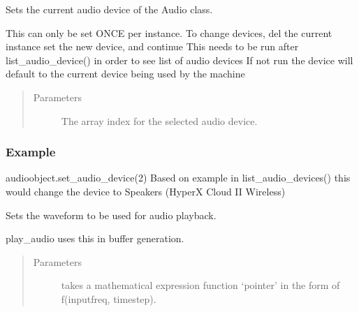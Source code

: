 \documentclass[letterpaper,10pt,english,openany,oneside]{sphinxmanual}
\begin{document}
\begin{fulllineitems}
\begin{fulllineitems}

\pysigstartsignatures
{}
\pysigstopsignatures
\sphinxAtStartPar
Sets the current audio device of the Audio class.

\sphinxAtStartPar
This can only be set ONCE per instance. To change devices, del the current instance
set the new device, and continue
This needs to be run after list\_audio\_device() in order to see list of audio devices
If not run the device will default to the current device being used by the machine
\begin{quote}\begin{description}
\item[{Parameters}] \leavevmode
\sphinxAtStartPar
{} \textendash{} The array index for the selected audio device.

\end{description}\end{quote}
\subsubsection*{Example}

\sphinxAtStartPar
audioobject.set\_audio\_device(2)
Based on example in list\_audio\_devices() this would change the device to Speakers (HyperX Cloud II Wireless)

\end{fulllineitems}



\begin{fulllineitems}

\pysigstartsignatures
{}
\pysigstopsignatures
\sphinxAtStartPar
Sets the waveform to be used for audio playback.

\sphinxAtStartPar
play\_audio uses this in buffer generation.
\begin{quote}\begin{description}
\item[{Parameters}] \leavevmode
\sphinxAtStartPar
{} \textendash{} takes a mathematical expression function ‘pointer’ in the form of f(inputfreq, timestep).

\end{description}\end{quote}

\end{fulllineitems}
\end{fulllineitems}
\end{document}

